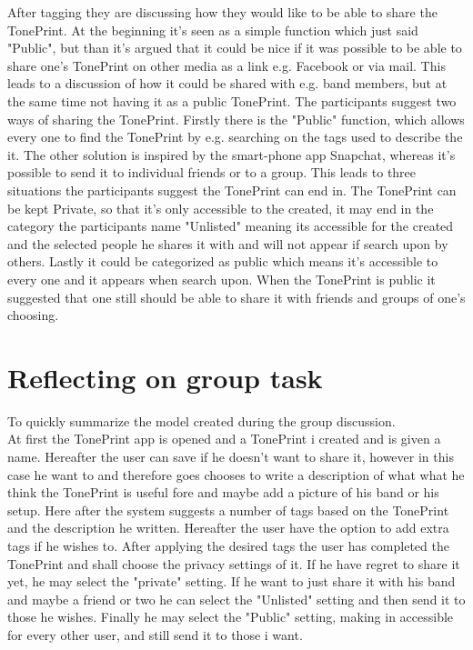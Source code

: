 After tagging they are discussing how they would like to be able to share the TonePrint. At the beginning it's seen as a simple function which just said "Public", but than it's argued that it could be nice if it was possible to be able to share one's TonePrint on other media as a link e.g. Facebook or via mail. This leads to a discussion of how it could be shared with e.g. band members, but at the same time not having it as a public TonePrint. The participants suggest two ways of sharing the TonePrint. Firstly there is the "Public" function, which allows every one to find the TonePrint by e.g. searching on the tags used to describe the it. The other solution is inspired by the smart-phone app Snapchat, whereas it's possible to send it to individual friends or to a group. This leads to three situations the participants suggest the TonePrint can end in. The TonePrint can be kept Private, so that it's only accessible to the created, it may end in the category the participants name "Unlisted" meaning its accessible for the created and the selected people he shares it with and will not appear if search upon by others. Lastly it could be categorized as public which means it's accessible to every one and it appears when search upon. When the TonePrint is public it suggested that one still should be able to share it with friends and groups of one's choosing.\\


\section{Reflecting on group task}
\label{GroupTaskReflection}
To quickly summarize the model created during the group discussion.\\
At first the TonePrint app is opened and a TonePrint i created and is given a name. Hereafter the user can save if he doesn't want to share it, however in this case he want to and therefore goes chooses to write a description of what what he think the TonePrint is useful fore and maybe add a picture of his band or his setup. Here after the system suggests a number of tags based on the TonePrint and the description he written. Hereafter the user have the option to add extra tags if he wishes to. After applying the desired tags the user has completed the TonePrint and shall choose the privacy settings of it. If he have regret to share it yet, he may select the "private" setting. If he want to just share it with his band and maybe a friend or two he can select the "Unlisted" setting and then send it to those he wishes. Finally he may select the "Public" setting, making in accessible for every other user, and still send it to those i want.


























